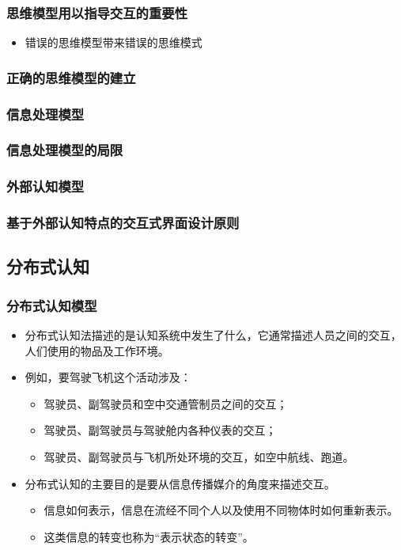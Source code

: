 \documentclass{beamer}
\begin{document}
\begin{frame}
	\frametitle{思维模型用以指导交互的重要性}
	\begin{itemize}
		\item 错误的思维模型带来错误的思维模式
	\end{itemize}
\end{frame}

\begin{frame}
	\frametitle{正确的思维模型的建立}

\end{frame}

\begin{frame}
	\frametitle{信息处理模型}

\end{frame}

\begin{frame}
	\frametitle{信息处理模型的局限}

\end{frame}

\begin{frame}
	\frametitle{外部认知模型}

\end{frame}

\begin{frame}
	\frametitle{基于外部认知特点的交互式界面设计原则}

\end{frame}

\subsection{分布式认知}
\begin{frame}
	\frametitle{分布式认知模型}
	\beamertemplatetransparentcovereddynamicmedium
	\begin{itemize}
		\item 分布式认知法描述的是认知系统中发生了什么，它通常描述人员之间的交互，人们使用的物品及工作环境。\pause
		\item 例如，要驾驶飞机这个活动涉及：
		\begin{itemize}
			\item 驾驶员、副驾驶员和空中交通管制员之间的交互；
			\item 驾驶员、副驾驶员与驾驶舱内各种仪表的交互；
			\item 驾驶员、副驾驶员与飞机所处环境的交互，如空中航线、跑道。
		\end{itemize}\pause
		\item 分布式认知的主要目的是要从信息传播媒介的角度来描述交互。
		\begin{itemize}
			\item 信息如何表示，信息在流经不同个人以及使用不同物体时如何重新表示。
			\item 这类信息的转变也称为“表示状态的转变”。
		\end{itemize}
	\end{itemize}
\end{frame}
\end{document}

